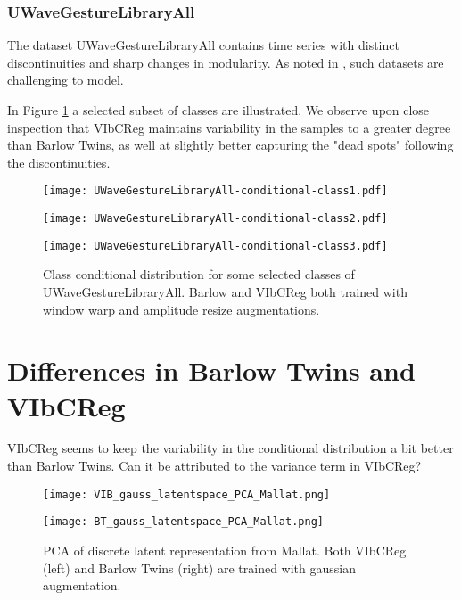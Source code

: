 \documentclass[../../thesis.tex]{subfiles}
\begin{document}
\subsubsection{UWaveGestureLibraryAll}
The dataset UWaveGestureLibraryAll contains time series with distinct discontinuities and sharp changes in modularity. As noted in \cite{TimeVQVAE}, such datasets are challenging to model.\newline

In Figure \ref{fig:Warp_Uwave} a selected subset of classes are illustrated. We observe upon close inspection that VIbCReg maintains variability in the samples to a greater degree than Barlow Twins, as well at slightly better capturing the "dead spots" following the discontinuities. \newline 


\begin{figure}[H]
    \centering
    \begin{minipage}[b]{0.32\textwidth}
        \centering
        \texttt{[image: UWaveGestureLibraryAll-conditional-class1.pdf]}
    \end{minipage}
    \begin{minipage}[b]{0.32\textwidth}
        \centering
        \texttt{[image: UWaveGestureLibraryAll-conditional-class2.pdf]}
    \end{minipage}
    \begin{minipage}[b]{0.32\textwidth}
        \centering
        \texttt{[image: UWaveGestureLibraryAll-conditional-class3.pdf]}
    \end{minipage}
    \caption{Class conditional distribution for some selected classes of UWaveGestureLibraryAll. Barlow and VIbCReg both trained with window warp and amplitude resize augmentations.}
    \label{fig:Warp_Uwave}
\end{figure}






\section{Differences in Barlow Twins and VIbCReg}

VIbCReg seems to keep the variability in the conditional distribution a bit better than Barlow Twins. Can it be attributed to the variance term in VIbCReg?

\begin{figure}[H]
    \centering
    \begin{minipage}[b]{0.48\textwidth}
        \centering
        \texttt{[image: VIB\_gauss\_latentspace\_PCA\_Mallat.png]}
    \end{minipage}
    \begin{minipage}[b]{0.48\textwidth}
        \centering
        \texttt{[image: BT\_gauss\_latentspace\_PCA\_Mallat.png]}
    \end{minipage}
    \caption{PCA of discrete latent representation from Mallat. Both VIbCReg (left) and Barlow Twins (right) are trained with gaussian augmentation.}
    \label{fig:Mallat_latent_PCA}
\end{figure}
\end{document}
